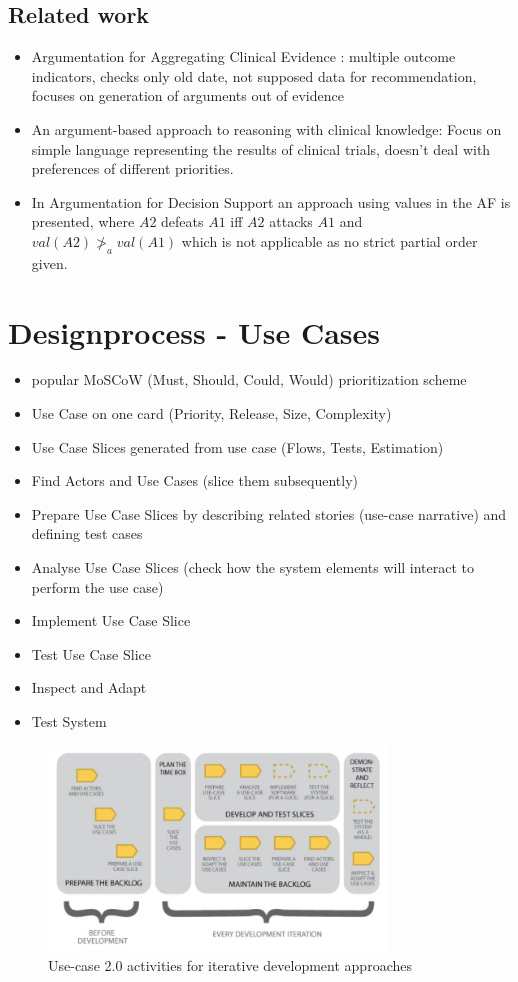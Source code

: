 \subsection{Related work}
\begin{itemize}
	\item Argumentation for Aggregating Clinical Evidence \cite{hunter}: multiple outcome indicators, checks only old date, not supposed data for recommendation, focuses on generation of arguments out of evidence
	\item An argument-based approach to reasoning with clinical knowledge\cite{Gorogiannis20091}: Focus on simple language representing the results of clinical trials, doesn't deal with preferences of different priorities.
	\item In Argumentation for Decision Support\cite{Atkinson2006} an approach using values in the AF is presented, where $A2$ defeats $A1$ iff $A2$ attacks $A1$ and $val(A2) \ngtr_a val(A1)$ which is not applicable as no strict partial order given.
\end{itemize}


\section{Designprocess - Use Cases}

\begin{itemize}
	\item popular MoSCoW (Must, Should, Could, Would) prioritization scheme
	\item Use Case on one card (Priority, Release, Size, Complexity)
	\item Use Case Slices generated from use case (Flows, Tests, Estimation)
	\item Find Actors and Use Cases (slice them subsequently)
	\item Prepare Use Case Slices by describing related stories (use-case narrative) and defining test cases
	\item Analyse Use Case Slices (check how the system elements will interact to perform the use case)
	\item Implement Use Case Slice
	\item Test Use Case Slice
	\item Inspect and Adapt
	\item Test System
\end{itemize}

\begin{figure}[!ht]
\centering
\includegraphics[width=0.8\textwidth]{figures/uc20_flow}
\caption{Use-case 2.0 activities for iterative development approaches}
\label{fig:Pict}
\end{figure}


